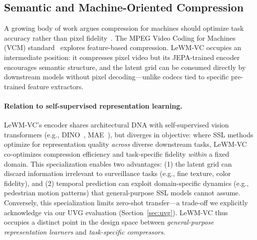\documentclass{article}
\begin{document}
\subsection{Semantic and Machine-Oriented Compression}
A growing body of work argues compression for machines should optimize task accuracy rather than pixel fidelity~\cite{duan2020vcm,wang2021semantic,choi2022latent}. The MPEG Video Coding for Machines (VCM) standard~\cite{MPEG2023VCM} explores feature-based compression. LeWM-VC occupies an intermediate position: it compresses pixel video but its JEPA-trained encoder encourages semantic structure, and the latent grid can be consumed directly by downstream models without pixel decoding---unlike codecs tied to specific pre-trained feature extractors.

\paragraph{Relation to self-supervised representation learning.}
LeWM-VC's encoder shares architectural DNA with self-supervised vision transformers (e.g., DINO~\cite{caron2021dino}, MAE~\cite{he2022masked}), but diverges in objective: where SSL methods optimize for representation quality \textit{across} diverse downstream tasks, LeWM-VC co-optimizes compression efficiency and task-specific fidelity \textit{within} a fixed domain. This specialization enables two advantages: (1) the latent grid can discard information irrelevant to surveillance tasks (e.g., fine texture, color fidelity), and (2) temporal prediction can exploit domain-specific dynamics (e.g., pedestrian motion patterns) that general-purpose SSL models cannot assume. Conversely, this specialization limits zero-shot transfer---a trade-off we explicitly acknowledge via our UVG evaluation (Section~\ref{sec:uvg}). LeWM-VC thus occupies a distinct point in the design space between \textit{general-purpose representation learners} and \textit{task-specific compressors}.
\end{document}
